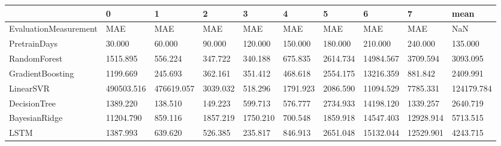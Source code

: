 \begin{tabular}{llllllllll}
\toprule
{} &          0 &          1 &        2 &        3 &        4 &        5 &         6 &         7 &       mean \\
\midrule
EvaluationMeasurement &        MAE &        MAE &      MAE &      MAE &      MAE &      MAE &       MAE &       MAE &        NaN \\
PretrainDays          &     30.000 &     60.000 &   90.000 &  120.000 &  150.000 &  180.000 &   210.000 &   240.000 &    135.000 \\
RandomForest          &   1515.895 &    556.224 &  347.722 &  340.188 &  675.835 & 2614.734 & 14984.567 &  3709.594 &   3093.095 \\
GradientBoosting      &   1199.669 &    245.693 &  362.161 &  351.412 &  468.618 & 2554.175 & 13216.359 &   881.842 &   2409.991 \\
LinearSVR             & 490503.516 & 476619.057 & 3039.032 &  518.296 & 1791.923 & 2086.590 & 11094.529 &  7785.331 & 124179.784 \\
DecisionTree          &   1389.220 &    138.510 &  149.223 &  599.713 &  576.777 & 2734.933 & 14198.120 &  1339.257 &   2640.719 \\
BayesianRidge         &  11204.790 &    859.116 & 1857.219 & 1750.210 &  700.548 & 1859.918 & 14547.403 & 12928.914 &   5713.515 \\
LSTM                  &   1387.993 &    639.620 &  526.385 &  235.817 &  846.913 & 2651.048 & 15132.044 & 12529.901 &   4243.715 \\
\bottomrule
\end{tabular}
